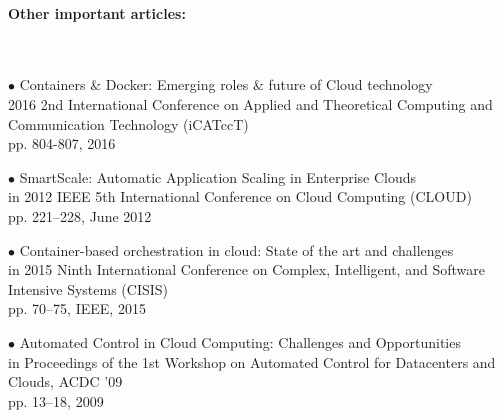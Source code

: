 \documentclass[11pt]{article}
\begin{document}
\paragraph{Other important articles:}
~\newline
~\newline
\begin{minipage}[t]{1\textwidth}
    \begin{description}
        \item $\bullet$ Containers \& Docker: Emerging roles \& future of Cloud technology \\ 2016 2nd International Conference on Applied and Theoretical Computing and Communication Technology (iCATccT)
        \\ pp. 804-807, 2016 
        \item $\bullet$ SmartScale: Automatic Application Scaling in Enterprise Clouds \\ in 2012
        IEEE 5th International Conference on Cloud Computing (CLOUD)
        \\ pp. 221–228, June 2012
        \item $\bullet$ Container-based orchestration in cloud: State of the art and challenges \\ in 2015 Ninth International Conference on Complex, Intelligent, and Software Intensive Systems (CISIS)
        \\  pp. 70–75, IEEE, 2015
        \item $\bullet$ Automated Control in Cloud Computing: Challenges and Opportunities \\ in Proceedings of the 1st Workshop on Automated Control for Datacenters and Clouds, ACDC ’09 \\
        pp. 13–18, 2009
    \end{description}
\end{minipage}
\end{document}
